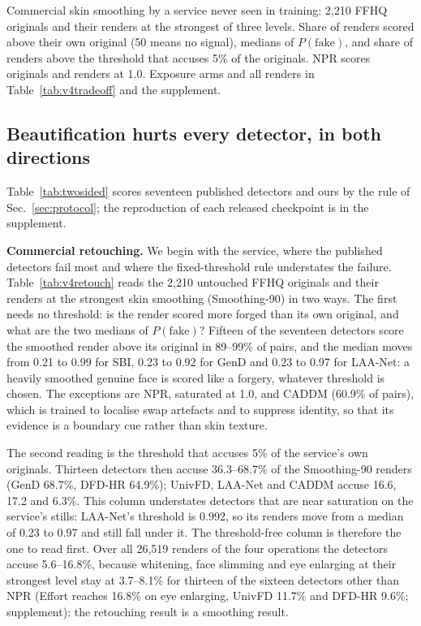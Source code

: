 \documentclass[conference]{IEEEtran}
\begin{document}
\begin{table}[t]
\centering
\caption{Commercial skin smoothing by a service never seen in training: 2,210 FFHQ originals and their renders at the
strongest of three levels. Share of renders scored above their own original (50 means no signal), medians of
$P(\text{fake})$, and share of renders above the threshold that accuses 5\% of the originals. NPR scores originals and
renders at 1.0. Exposure arms and all renders in Table~\ref{tab:v4tradeoff} and the supplement.}
\label{tab:v4retouch}
\scriptsize
\setlength{\tabcolsep}{3pt}
\begin{adjustbox}{max width=\columnwidth}\end{adjustbox}
\end{table}

\subsection{Beautification hurts every detector, in both directions}
\label{sec:measure}
Table~\ref{tab:twosided} scores seventeen published detectors and ours by the rule of Sec.~\ref{sec:protocol}; the
reproduction of each released checkpoint is in the supplement.

\textbf{Commercial retouching.} We begin with the service, where the published detectors fail most and where the
fixed-threshold rule understates the failure. Table~\ref{tab:v4retouch} reads the 2,210 untouched FFHQ originals and
their renders at the strongest skin smoothing (Smoothing-90) in two ways. The first needs no threshold: is the render
scored more forged than its own original, and what are the two medians of $P(\text{fake})$? Fifteen of the seventeen
detectors score the smoothed render above its original in 89--99\% of pairs, and the median moves from 0.21 to 0.99
for SBI, 0.23 to 0.92 for GenD and 0.23 to 0.97 for LAA-Net: a heavily smoothed genuine face is scored like a forgery,
whatever threshold is chosen. The exceptions are NPR, saturated at 1.0, and CADDM
(60.9\% of pairs), which is trained to localise swap artefacts and to suppress identity, so that its evidence is a
boundary cue rather than skin texture.

The second reading is the threshold that accuses 5\% of the service's own originals. Thirteen detectors then accuse
36.3--68.7\% of the Smoothing-90 renders (GenD 68.7\%, DFD-HR 64.9\%); UnivFD, LAA-Net and CADDM accuse 16.6, 17.2 and
6.3\%. This column understates detectors that are near saturation on the service's stills: LAA-Net's threshold is
0.992, so its renders move from a median of 0.23 to 0.97 and still fall under it. The threshold-free column is
therefore the one to read first.
Over all 26,519 renders of the four operations the detectors accuse 5.6--16.8\%, because whitening, face slimming and
eye enlarging at their strongest level stay at 3.7--8.1\% for thirteen of the sixteen detectors other than NPR (Effort reaches
16.8\% on eye enlarging, UnivFD 11.7\% and DFD-HR 9.6\%; supplement): the retouching result is a smoothing result.
\end{document}
